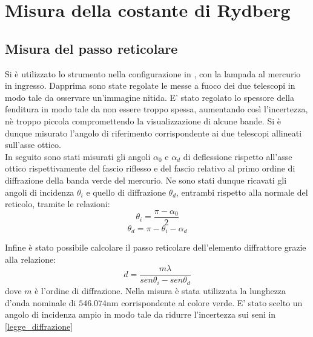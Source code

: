 \section{Misura della costante di Rydberg}

\subsection{Misura del passo reticolare}
Si è utilizzato lo strumento nella configurazione in , con la lampada al mercurio in ingresso. Dapprima sono state regolate le messe a fuoco dei due telescopi in modo tale da osservare un'immagine nitida. E' stato regolato lo spessore della fenditura in modo tale da non essere troppo spessa, aumentando così l'incertezza, nè troppo piccola compromettendo la visualizzazione di alcune bande. Si è dunque misurato l'angolo di riferimento corrispondente ai due telescopi allineati sull'asse ottico.\\
 In seguito sono stati misurati gli angoli $\alpha_{0}$ e $\alpha_{d}$ di deflessione rispetto all'asse ottico rispettivamente del fascio riflesso e del fascio relativo al primo ordine di diffrazione della banda verde del mercurio. Ne sono stati dunque ricavati gli angoli di incidenza $\theta_{i}$ e quello di diffrazione $\theta_{d}$, entrambi rispetto alla normale del reticolo, tramite le relazioni:
 \begin{equation}
 \theta_{i}=\frac{\pi-\alpha_{0}}{2}
 \end{equation}
 \begin{equation}
  \theta_{d}=\pi-\theta_{i}-\alpha_d
 \end{equation}
 
 Infine è stato possibile calcolare il passo reticolare dell'elemento diffrattore grazie alla relazione:
\begin{equation}
d = \frac{m\lambda}{sen\theta_{i} - sen\theta_{d}}
\label{legge_diffrazione}
\end{equation} 
dove $m$ è l'ordine di diffrazione. Nella misura è stata utilizzata la lunghezza d'onda nominale di $546.074$nm  corrispondente al colore verde. E' stato scelto un angolo di incidenza ampio in modo tale da ridurre l'incertezza sui seni in \ref{legge_diffrazione} \\

